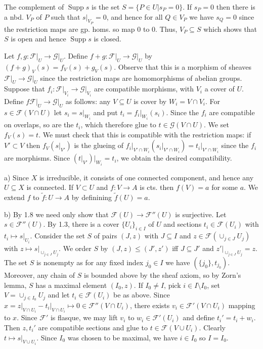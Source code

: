 \documentclass{report}
\newcommand{\F}{\mathcal{F}}
\newcommand{\G}{\mathcal{G}}
\DeclareMathOperator{\Supp}{Supp}
\begin{document}
\bigskip
{}	The complement of $\Supp s$ is the set $S=\{P\in U\big|s_P=0\}$.  If $s_P=0$ then there is a nbd. $V_P$ of $P$
such that $s\big|_{V_P}=0$, and hence for all $Q\in V_P$ we have $s_Q=0$ since the restriction maps are gp. homs.
so map 0 to 0.  Thus, $V_P\subseteq S$ which shows that $S$ is open and hence $\Supp s$ is closed.

\bigskip
{}	Let $f,g:\F\big|_U\rightarrow\G\big|_U$.  Define $f+g:\F\big|_U\rightarrow \G\big|_U$ by $(f+g)_V(s)=f_V(s)+g_V(s)$.  Observe
that this is a morphism of sheaves $\F\big|_U\rightarrow\G\big|_U$ since the restriction maps are homomorphisms 
of abelian groups.  Suppose that $f_i:\F\big|_{V_i}\rightarrow \G\big|_{V_i}$ are compatible morphisms, with $V_i$ a cover of $U$.
Define $f\F\big|_U\rightarrow\G\big|_U$ as follows: any $V\subseteq U$ is cover by $W_i=V\cap V_i$.  For $s\in \F(V\cap U)$
let $s_i=s\big|_{W_i}$ and put $t_i=f_i\big|_{W_i}(s_i)$.  Since the $f_i$ are compatible on overlaps, so are the $t_i$, which
therefore glue to $t\in \G(V\cap U)$.  We set $f_V(s)=t$.  We must check that this is compatible with the restriction maps:
if $V'\subset V$ then $f_V(s\big|_{V'})$ is the glueing of $f_i\big|_{V'\cap W_i}(s_i\big|_{V'\cap W_i})=t_i\big|_{V'\cap W_i}$
since the $f_i$ are morphisms.  Since $(t\big|_{V'})\big|_{W_i}=t_i$, we obtain the desired compatibility.

\bigskip
{}	a) Since $X$ is irreducible, it consists of one connected component, and hence any $U\subseteq X$ is connected.
If $V\subset U$ and $f:V\rightarrow A$ is cts. then $f(V)=a$ for some $a$.  We extend $f$ to $\widetilde{f}:U\rightarrow A$
by definining $\widetilde{f}(U)=a$.

\noindent
b)	By 1.8 we need only show that $\F(U)\rightarrow \F''(U)$ is surjective.  Let $s\in \F''(U)$.  By 1.3, there is a cover $\{U_i\}_{i\in I}$ of $U$
and sections $t_i\in\F(U_i)$ with $t_i\mapsto s\big|_{U_i}$.  Consider the set $S$ of pairs $(J,z)$ with $J\subseteq I$
and $z\in \F(\cup_{j\in J} U_j)$ with $z\mapsto s\big|_{\cup_{j\in J} U_j}$.
We order $S$ by $(J,z)\le (J',z')$ iff $J\subseteq J'$ and $z'\big|_{\cup_{j\in J}U_j}=z$.  The set $S$ is nonempty as 
for any fixed index $j_0\in I$ we have $(\{j_0\},t_{j_0})$.  Moreover, any chain of $S$ is bounded above by the sheaf axiom, 
so by Zorn's lemma, $S$ has a maximal
element $(I_0,z)$.  If $I_0\neq I$, pick $i\in I\setminus I_0$, set $V=\cup_{j\in I_0}U_j$ and let $t_i\in \F(U_i)$ be as above.
Since $x=z\big|_{V\cap U_i}-t_i\big|_{V\cap U_i}\mapsto 0\in \F''(V\cap U_i)$, there exists $v_i\in \F'(V\cap U_i)$ mapping to
$x$.  Since $\F'$ is flasque, we may lift $v_i$ to $w_i\in \F'(U_i)$ and define $t_i'=t_i+w_i$.  Then $z,t_i'$ are compatible sections and glue
to $t\in \F(V\cup U_i)$.  Clearly $t\mapsto s\big|_{V\cup U_i}$.  Since $I_0$ was chosen to be maximal, we have $i\in I_0$ so $I=I_0$.
\end{document}
